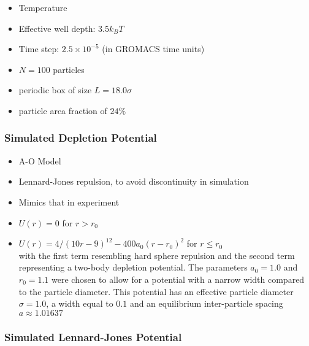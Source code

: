 \documentclass[11pt]{article}
\begin{document}
\begin{itemize}
\item Temperature\\
\label{sec-2-3-3-4}%
\item Effective well depth: $3.5 k_B T$\\
\label{sec-2-3-3-5}%
\item Time step: $2.5 \times 10^{-5}$ (in GROMACS time units)\\
\label{sec-2-3-3-6}%
\item $N=100$ particles\\
\label{sec-2-3-3-7}%
\item periodic box of size $L = 18.0 \sigma$\\
\label{sec-2-3-3-8}%
\item particle area fraction of $24\%$\\
\label{sec-2-3-3-9}%
\end{itemize} %
\subsubsection{Simulated Depletion Potential}
\label{sec-2-3-4}
\begin{itemize}

\item A-O Model\\
\label{sec-2-3-4-1}%
\item Lennard-Jones repulsion, to avoid discontinuity in simulation\\
\label{sec-2-3-4-2}%
\item Mimics that in experiment\\
\label{sec-2-3-4-3}%
\item $U(r)=0$ for $r > r_0$\\
\label{sec-2-3-4-4}%
\item $U(r)=4/(10r-9)^{12} -  400 a_0 (r-r_0)^2$ for $r \le r_0$\\
\label{sec-2-3-4-5}%
with the first term resembling hard sphere repulsion and the second term  representing a two-body depletion potential. The parameters $a_0=1.0$ and $r_0=1.1$ were chosen to allow for  a potential with a narrow width compared to the particle diameter. This potential has an effective particle diameter $\sigma=1.0$,  a width equal to $0.1$ and an equilibrium inter-particle spacing $a \approx 1.01637$

\end{itemize} %
\subsubsection{Simulated Lennard-Jones Potential}
\label{sec-2-3-5}
\end{document}
